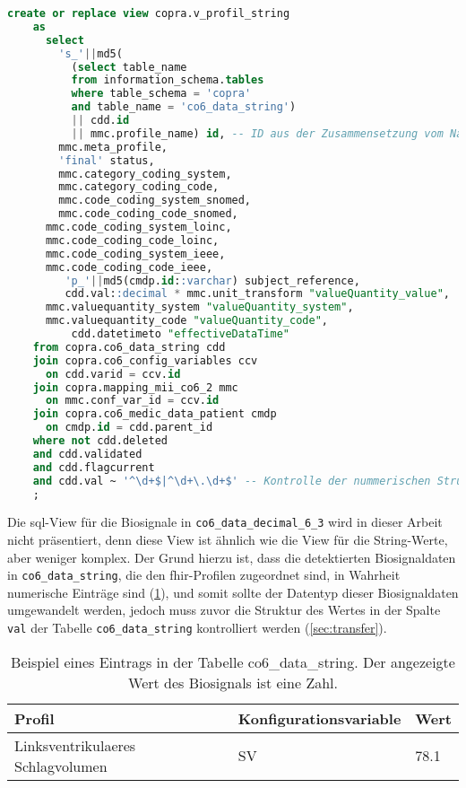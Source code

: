 \begin{lstlisting}[language=SQL, caption={[SQL-View für Werte in co6\_data\_string] SQL-View für Werte in co6\_data\_string.}, captionpos=b, label=list:viewsdicimalstring]
	create or replace view copra.v_profil_string 
	as
	  select 
        's_'||md5(
	      (select table_name 
	      from information_schema.tables 
	      where table_schema = 'copra'
	      and table_name = 'co6_data_string') 
	      || cdd.id 
	      || mmc.profile_name) id, -- ID aus der Zusammensetzung vom Namen der Werttabelle, id des Werts und Name des Profils
	    mmc.meta_profile,
	    'final' status,
	    mmc.category_coding_system,
	    mmc.category_coding_code,
	    mmc.code_coding_system_snomed,
	    mmc.code_coding_code_snomed,
      mmc.code_coding_system_loinc,
      mmc.code_coding_code_loinc,
      mmc.code_coding_system_ieee,
      mmc.code_coding_code_ieee,
		 'p_'||md5(cmdp.id::varchar) subject_reference,
		 cdd.val::decimal * mmc.unit_transform "valueQuantity_value",  -- type casting und Umrechnung
      mmc.valuequantity_system "valueQuantity_system",
      mmc.valuequantity_code "valueQuantity_code",
		  cdd.datetimeto "effectiveDataTime"
	from copra.co6_data_string cdd 
	join copra.co6_config_variables ccv 
	  on cdd.varid = ccv.id 
	join copra.mapping_mii_co6_2 mmc 
	  on mmc.conf_var_id = ccv.id 
	join copra.co6_medic_data_patient cmdp 
	  on cmdp.id = cdd.parent_id 
	where not cdd.deleted
	and cdd.validated 
	and cdd.flagcurrent
	and cdd.val ~ '^\d+$|^\d+\.\d+$' -- Kontrolle der nummerischen Struktur der Werte
	;
\end{lstlisting}

Die \ac{sql}-View für die Biosignale in \texttt{co6\_data\_decimal\_6\_3} wird in dieser Arbeit nicht präsentiert, denn diese View ist ähnlich wie die View für die String-Werte, aber weniger komplex. Der Grund hierzu ist, dass die detektierten Biosignaldaten in \texttt{co6\_data\_string}, die den \ac{fhir}-Profilen zugeordnet sind, in Wahrheit numerische Einträge sind (\ref{tab:stringvalue}), und somit sollte der Datentyp dieser Biosignaldaten umgewandelt werden, jedoch muss zuvor die Struktur des Wertes in der Spalte \texttt{val} der Tabelle \texttt{co6\_data\_string} kontrolliert werden (\ref{sec:transfer}).

\clearpage

\begin{table}[ht]
	\centering 
	\caption[Eintrag in der Tabelle co6\_data\_string]{Beispiel eines Eintrags in der Tabelle co6\_data\_string. Der angezeigte Wert des Biosignals ist eine Zahl.}
	\label{tab:stringvalue}
	\begin{tabular}{|l|l|l|}
		\hline
		\bfseries Profil & \bfseries Konfigurationsvariable & \bfseries Wert \\ \hline
		Linksventrikulaeres Schlagvolumen & SV & 78.1 \\ \hline
	\end{tabular}
\end{table}

